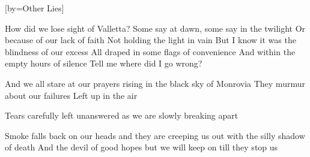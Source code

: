 [by={Other Lies}]

  \chordsoff
  \beginverse
  How did we lose sight of Valletta?
  Some say at dawn, some say in the twilight
  Or because of our lack of faith
  Not holding the light in vain
  But I know it was the blindness of our excess
  All draped in some flags of convenience
  And within the empty hours of silence
  Tell me where did I go wrong?
  \endverse

  \beginchorus
  And we all stare at our prayers rising in the black sky of Monrovia
  They murmur about our failures
  Left up in the air
  
  Tears carefully left unanswered as we are slowly breaking apart  
  \endchorus

  \beginverse
  Smoke falls back on our heads and they are creeping us out with the silly shadow of death 
  And the devil of good hopes but we will keep on till they stop us
  \endverse
  
\endsong
